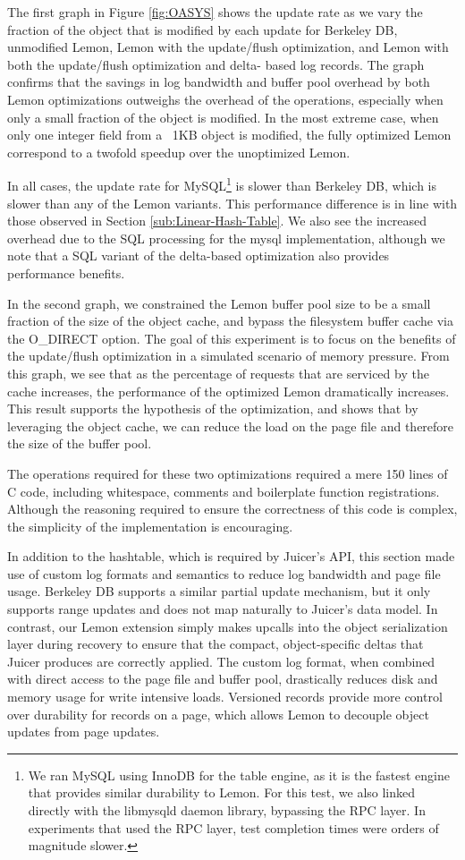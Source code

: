 \documentclass[10pt,letterpaper,twocolumn,english]{article}
\newcommand{\yad}{Lemon\xspace}
\newcommand{\oasys}{Juicer\xspace}
\begin{document}
The first graph in Figure \ref{fig:OASYS} shows the update rate as we
vary the fraction of the object that is modified by each update for
Berkeley DB, unmodified \yad, \yad with the update/flush optimization,
and \yad with both the update/flush optimization and delta- based log
records.
The graph confirms that the savings in log bandwidth and
buffer pool overhead by both \yad optimizations 
outweighs the overhead of the operations, especially when only a small
fraction of the object is modified.
In the most extreme case, when
only one integer field from a ~1KB object is modified, the fully
optimized \yad correspond to a twofold speedup over the unoptimized
\yad.

In all cases, the update rate for MySQL\footnote{We ran MySQL using
InnoDB for the table engine, as it is the fastest engine that provides
similar durability to \yad. For this test, we also linked directly
with the libmysqld daemon library, bypassing the RPC layer. In
experiments that used the RPC layer, test completion times were orders
of magnitude slower.} is slower than Berkeley DB,
which is slower than any of the \yad variants. This performance
difference is in line with those observed in Section
\ref{sub:Linear-Hash-Table}. We also see the increased overhead due to
the SQL processing for the mysql implementation, although we note that
a SQL variant of the delta-based optimization also provides performance
benefits.

In the second graph, we constrained the \yad buffer pool size to be a
small fraction of the size of the object cache, and bypass the filesystem
buffer cache via the O\_DIRECT option. The goal of this experiment is to
focus on the benefits of the update/flush optimization in a simulated
scenario of memory pressure. From this graph, we see that as the percentage of
requests that are serviced by the cache increases, the
performance of the optimized \yad dramatically increases.
This result supports the hypothesis of the optimization, and
shows that by leveraging the object cache, we can reduce the load on
the page file and therefore the size of the buffer pool.

The operations required for these
two optimizations required a mere 150 lines of C code, including
whitespace, comments and boilerplate function registrations.  Although
the reasoning required to ensure the correctness of this code is
complex, the simplicity of the implementation is encouraging.

In addition to the hashtable, which is required by \oasys's API, this
section made use of custom log formats and semantics to reduce log
bandwidth and page file usage.  Berkeley DB supports a similar
partial update mechanism, but it only
supports range updates and does not map naturally to \oasys's data
model.  In contrast, our \yad extension simply makes upcalls
into the object serialization layer during recovery to ensure that the
compact, object-specific deltas that \oasys produces are correctly
applied.  The custom log format, when combined with direct access to
the page file and buffer pool, drastically reduces disk and memory usage
for write intensive loads.
Versioned records provide more control over durability for
records on a page, which allows \yad to decouple object updates from page
updates.
\end{document}
